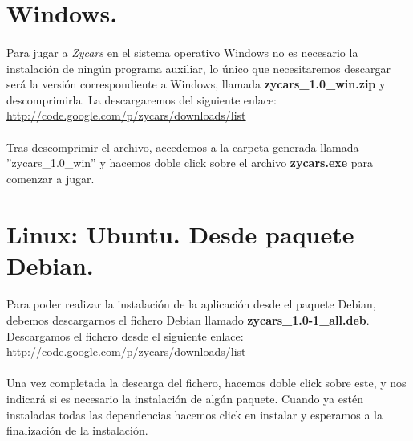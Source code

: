 \section{Windows.}

\paragraph{}
Para jugar a \emph{Zycars} en el sistema operativo Windows no es necesario la instalación de ningún programa
auxiliar, lo único que necesitaremos descargar será la versión correspondiente
a Windows, llamada \textbf{zycars\_1.0\_win.zip } y descomprimirla. La descargaremos
del siguiente enlace:\\

\url{http://code.google.com/p/zycars/downloads/list}

\paragraph{}
Tras descomprimir el archivo, accedemos a la carpeta generada llamada ''zycars\_1.0\_win'' y hacemos doble click 
sobre el archivo \textbf{zycars.exe} para comenzar a jugar.


\section{Linux: Ubuntu. Desde paquete Debian.}

\paragraph{}
Para poder realizar la instalación de la aplicación desde el paquete Debian, debemos descargarnos el fichero Debian 
llamado \textbf{zycars\_1.0-1\_all.deb}. Descargamos el fichero desde el siguiente enlace:\\

\url{http://code.google.com/p/zycars/downloads/list}

\paragraph{}
Una vez completada la descarga del fichero, hacemos doble click sobre este, y nos indicará si es necesario la instalación 
de algún paquete. Cuando ya estén instaladas todas las dependencias hacemos click en instalar y esperamos a la finalización
de la instalación.

